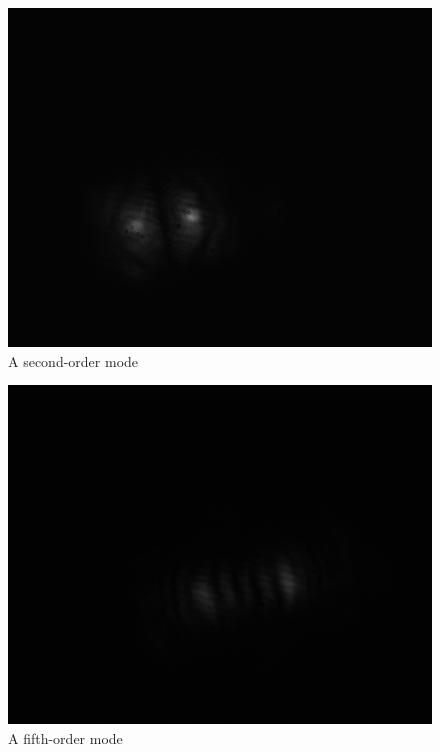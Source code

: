 \documentclass[10pt,a4paper]{article}
\begin{document}
\begin{figure}[H]
\centering
\includegraphics[width=\textwidth]{../Analysis/Lab5Mode7.png}
\caption{A second-order mode}
\end{figure}
\begin{figure}[H]
\centering
\includegraphics[width=\textwidth]{../Analysis/Lab5Mode2.png} 
\caption{A fifth-order mode}
\end{figure}
\end{document}
